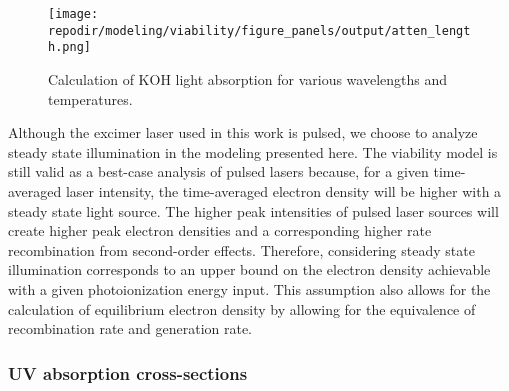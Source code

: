 \begin{figure}[ht]
    \centering
    \texttt{[image: \\repodir/modeling/viability/figure\_panels/output/atten\_length.png]}
    \caption{Calculation of KOH light absorption for various wavelengths and temperatures.}
    \label{fig:SI_atten_length}
\end{figure}

Although the excimer laser used in this work is pulsed, we choose to analyze steady state illumination in the modeling presented here. The viability model is still valid as a best-case analysis of pulsed lasers because, for a given time-averaged laser intensity, the time-averaged electron density will be higher with a steady state light source. The higher peak intensities of pulsed laser sources will create higher peak electron densities and a corresponding higher rate recombination from second-order effects. Therefore, considering steady state illumination corresponds to an upper bound on the electron density achievable with a given photoionization energy input. This assumption also allows for the calculation of equilibrium electron density by allowing for the equivalence of recombination rate and generation rate.
\subsubsection{UV absorption cross-sections}

